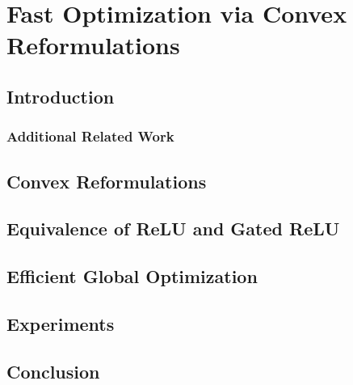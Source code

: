 
\chapter{Fast Optimization via Convex Reformulations}\label{chapter:fast-optimization}

\section{Introduction}\label{sec:intro}



\subsection{Additional Related Work}



\section{Convex Reformulations}\label{sec:convex-formulations}



\section{Equivalence of ReLU and Gated ReLU}\label{sec:relu-grelu-equivalence}



\section{Efficient Global Optimization}\label{sec:}



\section{Experiments}\label{sec:experiments}



\section{Conclusion}\label{sec:conclusion}


